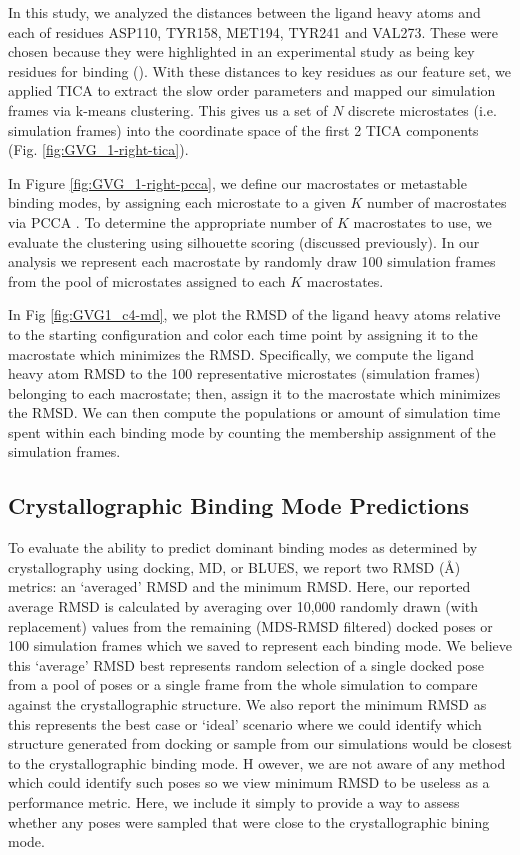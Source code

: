 In this study, we analyzed the distances between the ligand heavy atoms and each of residues ASP110, TYR158, MET194, TYR241 and VAL273.
These were chosen because they were highlighted in an experimental study as being key residues for binding (\cite{lotz_unbiased_2018}).
With these distances to key residues as our feature set, we applied TICA \cite{perez-hernandez_identification_2013} to extract the slow order parameters and mapped our simulation frames via k-means clustering.
This gives us a set of $N$ discrete microstates (i.e. simulation frames) into the coordinate space of the first 2 TICA components (Fig. \ref{fig:GVG_1-right-tica}).

In Figure \ref{fig:GVG_1-right-pcca},  we define our macrostates or metastable binding modes, by assigning each microstate to a given $K$ number of macrostates via PCCA \cite{roblitz_fuzzy_2013,deuflhard_robust_2005}.
To determine the appropriate number of $K$ macrostates to use, we evaluate the clustering using silhouette scoring \cite{scikit_kmeans} (discussed previously).
In our analysis we represent each macrostate by randomly draw 100 simulation frames from the pool of microstates assigned to each $K$ macrostates.

In Fig \ref{fig:GVG1_c4-md}, we plot the RMSD of the ligand heavy atoms relative to the starting configuration and color each time point by assigning it to the macrostate which minimizes the RMSD.
Specifically, we compute the ligand heavy atom RMSD to the 100 representative microstates (simulation frames) belonging to each macrostate; then, assign it to the macrostate which minimizes the RMSD.
We can then compute the populations or amount of simulation time spent within each binding mode by counting the membership assignment of the simulation frames.

\subsection{Crystallographic Binding Mode Predictions}
To evaluate the ability to predict dominant binding modes as determined by crystallography using docking, MD, or BLUES, we report two RMSD ({\AA}) metrics: an `averaged' RMSD and the minimum RMSD.
Here, our reported average RMSD is calculated by averaging over 10,000 randomly drawn (with replacement) values from the remaining (MDS-RMSD filtered) docked poses or 100 simulation frames which we saved to represent each binding mode.
We believe this `average' RMSD best represents random selection of a single docked pose from a pool of poses or a single frame from the whole simulation to compare against the crystallographic structure.
We also report the minimum RMSD as this represents the best case or `ideal' scenario where we could identify which structure generated from docking or sample from our simulations would be closest to the crystallographic binding mode. H
owever, we are not aware of any method which could identify such poses so we view minimum RMSD to be useless as a performance metric.
Here, we include it simply to provide a way to assess whether any poses were sampled that were close to the crystallographic bining mode.

